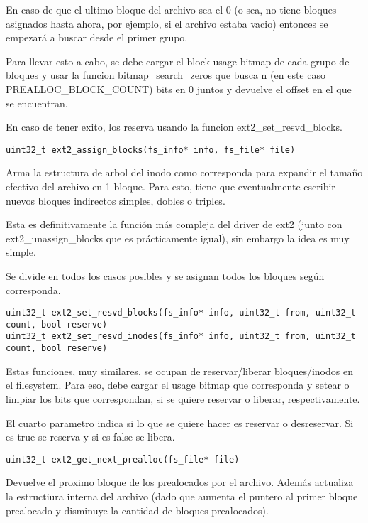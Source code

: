 En caso de que el ultimo bloque del archivo sea el 0 (o sea, no tiene bloques asignados hasta ahora, por ejemplo, si el archivo estaba vacio) entonces se empezará a buscar desde el primer grupo.

Para llevar esto a cabo, se debe cargar el block usage bitmap de cada grupo de bloques y usar la funcion bitmap\_search\_zeros que busca n (en este caso PREALLOC\_BLOCK\_COUNT) bits en 0 juntos y devuelve el offset en el que se encuentran.

En caso de tener exito, los reserva usando la funcion ext2\_set\_resvd\_blocks.


\begin{lstlisting}[style=customc]
uint32_t ext2_assign_blocks(fs_info* info, fs_file* file)
\end{lstlisting}

Arma la estructura de arbol del inodo como corresponda para expandir el tamaño efectivo del archivo en 1 bloque. Para esto, tiene que eventualmente escribir nuevos bloques indirectos simples, dobles o triples.

Esta es definitivamente la función más compleja del driver de ext2 (junto con ext2\_unassign\_blocks que es prácticamente igual), sin embargo la idea es muy simple.

Se divide en todos los casos posibles y se asignan todos los bloques según corresponda.

\begin{lstlisting}[style=customc]
uint32_t ext2_set_resvd_blocks(fs_info* info, uint32_t from, uint32_t count, bool reserve)
uint32_t ext2_set_resvd_inodes(fs_info* info, uint32_t from, uint32_t count, bool reserve)
\end{lstlisting}

Estas funciones, muy similares, se ocupan de reservar/liberar bloques/inodos en el filesystem. Para eso, debe cargar el usage bitmap que corresponda y setear o limpiar los bits que correspondan, si se quiere reservar o liberar, respectivamente. 

El cuarto parametro indica si lo que se quiere hacer es reservar o desreservar. Si es true se reserva y si es false se libera.

\begin{lstlisting}[style=customc] 
uint32_t ext2_get_next_prealloc(fs_file* file)
\end{lstlisting}

Devuelve el proximo bloque de los prealocados por el archivo. Además actualiza la estructiura interna del archivo (dado que aumenta el puntero al primer bloque prealocado y disminuye la cantidad de bloques prealocados).


